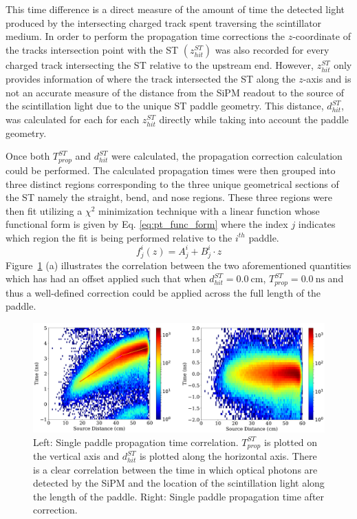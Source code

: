 This time difference is a direct measure of the amount of time the detected light produced by the intersecting charged track spent traversing the scintillator medium.  In order to perform the propagation time corrections the $z$-coordinate of the tracks intersection point with the ST $(z^{ST}_{hit})$ was also recorded for every charged track intersecting the ST relative to the upstream end.  However, $z^{ST}_{hit}$ only provides information of where the track intersected the ST along the $z$-axis and is not an accurate measure of the distance from the SiPM readout to the source of the scintillation light due to the unique ST paddle geometry.  This distance, $d^{ST}_{hit}$, was calculated for each for each $z^{ST}_{hit}$ directly while taking into account the paddle geometry. 

Once both $T^{ST}_{prop}$ and $d^{ST}_{hit}$ were calculated, the propagation correction calculation could be performed.  The calculated propagation times were then grouped into three distinct regions corresponding to the three unique geometrical sections of the ST namely the straight, bend, and nose regions.  These three regions were then fit utilizing a $\chi^{2}$ minimization technique with a linear function whose functional form is given by Eq. \ref{eq:pt_func_form} where the index $j$ indicates which region the fit is being performed relative to the $i^{th}$ paddle.
	\begin{equation} \label{eq:pt_func_form}
	f^{i}_{j}(z) = A^{i}_{j} + B^{i}_{j} \cdot z
	\end{equation}
Figure~\ref{fig:proptimeuncorr} (a) illustrates the correlation between the two aforementioned quantities which has had an offset applied such that when $d^{ST}_{hit} = 0.0\ \mathrm{cm}$, $T^{ST}_{prop} = 0.0\ \mathrm{ns}$ and thus a well-defined correction could be applied across the full length of the paddle.
\begin{figure}[!htb]
	\centering
	\includegraphics[width=1.0\textwidth]{calibration/figs/PT_correction.pdf}
	\caption{Left: Single paddle propagation time correlation.  $T^{ST}_{prop}$ is plotted on the vertical axis and $d^{ST}_{hit}$ is plotted along the horizontal axis. There is a clear correlation between the time in which optical photons are detected by the SiPM and the location of the scintillation light along the length of the paddle. Right: Single paddle propagation time after correction.}
	\label{fig:proptimeuncorr}
\end{figure}


